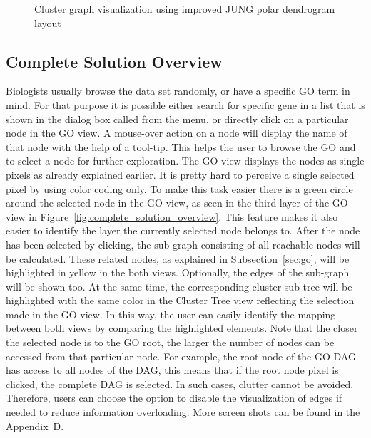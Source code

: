 \begin{figure}[h!]
{    \label{fig:cluster_jogl_impl_with_subgraph_2}
}
\caption{Cluster graph visualization using improved JUNG polar dendrogram layout}
\end{figure}







\subsection{Complete Solution Overview}
\label{sec:complete_solution_overview}

Biologists usually browse the data set randomly, or have a specific GO term in mind. For that purpose it is possible either search for specific gene in a list that is shown in the dialog box called from the menu, or directly click on a particular node in the GO view. A mouse-over action on a node will display the name of that node with the help of a tool-tip. This helps the user to browse the GO and to select a node for further exploration. The GO view displays the nodes as single pixels as already explained earlier. It is pretty hard to perceive a single selected pixel by using color coding only. To make this task easier there is a green circle around the selected node in the GO view, as seen in the third layer of the GO view in Figure~\ref{fig:complete_solution_overview}. This feature makes it also easier to identify the layer the currently selected node belongs to. After the node has been selected by clicking, the sub-graph consisting of all reachable nodes will be calculated. These related nodes, as explained in Subsection~\ref{sec:go}, will be highlighted in yellow in the both views. Optionally, the edges of the sub-graph will be shown too. At the same time, the corresponding cluster sub-tree will be highlighted with the same color in the Cluster Tree view reflecting the selection made in the GO view. In this way, the user can easily identify the mapping between both views by comparing the highlighted elements. Note that the closer the selected node is to the GO root, the larger the number of nodes can be accessed from that particular node. For example, the root node of the GO DAG has access to all nodes of the DAG, this means that if the root node pixel is clicked, the complete DAG is selected. In such cases, clutter cannot be avoided. Therefore, users can choose the option to disable the visualization of edges if needed to reduce information overloading. More screen shots can be found in the Appendix~D.

